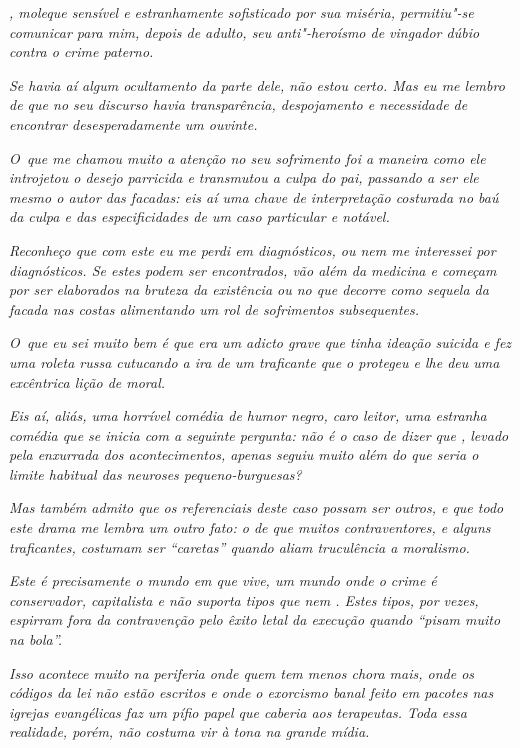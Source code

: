 \emph{, moleque sensível e estranhamente sofisticado por sua miséria,
permitiu"-se comunicar para mim, depois de adulto, seu anti"-heroísmo de
vingador dúbio contra o crime paterno.}

\emph{Se havia aí algum ocultamento da parte dele, não estou certo. Mas
eu me lembro de que no seu discurso havia transparência, despojamento e
necessidade de encontrar desesperadamente um ouvinte.}

\emph{O~que me chamou muito a atenção no seu sofrimento foi a maneira
como ele introjetou o desejo parricida e transmutou a culpa do pai,
passando a ser ele mesmo o autor das facadas: eis aí uma chave de
interpretação costurada no baú da culpa e das especificidades de um caso
particular e notável.}

\emph{Reconheço que com este  eu me perdi em diagnósticos, ou nem me
interessei por diagnósticos. Se estes podem ser encontrados, vão além da
medicina e começam por ser elaborados na bruteza da existência ou no que
decorre como sequela da facada nas costas alimentando um rol de
sofrimentos subsequentes.}

\emph{O~que eu sei muito bem é que  era um adicto grave que tinha
ideação suicida e fez uma roleta russa cutucando a ira de um traficante
que o protegeu e lhe deu uma excêntrica lição de moral.}

\emph{Eis aí, aliás, uma horrível comédia de humor negro, caro leitor,
uma estranha comédia que se inicia com a seguinte pergunta: não é o caso
de dizer que , levado pela enxurrada dos acontecimentos, apenas seguiu
muito além do que seria o limite habitual das neuroses pequeno-burguesas?}

\emph{Mas também admito que os referenciais deste caso possam ser
outros, e que todo este drama me lembra um outro fato: o de que muitos
contraventores, e alguns traficantes, costumam ser ``caretas'' quando
aliam truculência a moralismo.}

\emph{Este é precisamente o mundo em que  vive, um mundo onde o crime
é conservador, capitalista e não suporta tipos que nem . Estes tipos,
por vezes, espirram fora da contravenção pelo êxito letal da execução
quando ``pisam muito na bola''.}

\emph{Isso acontece muito na periferia onde quem tem menos chora mais,
onde os códigos da lei não estão escritos e onde o exorcismo banal feito
em pacotes nas igrejas evangélicas faz um pífio papel que caberia aos
terapeutas. Toda essa realidade, porém, não costuma vir à tona na grande
mídia.}


